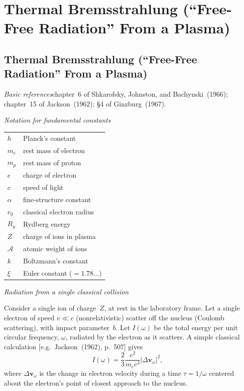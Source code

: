 
\section{Thermal Bremsstrahlung (``Free-Free Radiation'' From a Plasma)}
\label{sec:2}

\subsection{Thermal Bremsstrahlung (``Free-Free Radiation'' From a Plasma)}
\label{sec:2.1}

\textit{Basic references}\quad chapter~6 of Shkarofsky, Johnston, and
Bachynski~(1966)\cite{Shkarofsky1966};
chapter~15 of Jackson~(1962)\cite{Jackson1962}; \S4 of
Ginzburg~(1967)\cite{Ginzburg1967}.

\bigskip

\textit{Notation for fundamental constants}

\medskip

\noindent
\begin{tabular}{ll}
$h$            & Planck's constant \\
$m_e$          & rest mass of electron \\
$m_p$          & rest mass of proton \\
$e$            & charge of electron \\
$c$            & speed of light \\
$\alpha$       & fine-structure constant \\
$r_0$          & classical electron radius \\
$R_y$          & Rydberg energy \\
$Z$            & charge of ions in plasma \\
$\mathcal{A}$  & atomic weight of ions \\
$k$            & Boltzmann's constant \\
$\xi$          & Euler constant ($= 1.78\ldots$)
\end{tabular}

\bigskip

\textit{Radiation from a single classical collision}

\medskip

Consider a single ion of charge~$Z$, at rest in the laboratory frame. Let a single
electron of speed $v \ll c$ (nonrelativistic) scatter off the nucleus (Coulomb
scattering), with impact parameter~$b$. Let $I(\omega)$ be the total energy per unit
circular frequency, $\omega$, radiated by the electron as it scatters. A simple classical
calculation [e.g.\ Jackson~(1962)\cite{Jackson1962}, p.~507] gives
%
\begin{equation}
I(\omega) = \frac{2}{3} \frac{e^2}{m_e c^3} \left|\Delta \mathbf{v}_\omega\right|^2,
\tag{2.1.1}
\end{equation}
%
where $\Delta \mathbf{v}_\omega$ is the change in electron velocity during a time $\tau = 1/\omega$ centered
about the electron's point of closest approach to the nucleus.

